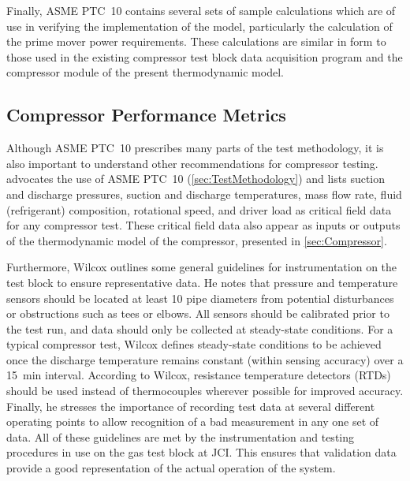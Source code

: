 Finally, ASME PTC~10 contains several sets of sample calculations 
which are of use in verifying the implementation of the model, 
particularly the calculation of the prime mover power requirements.
These calculations are similar in form to those used in the existing
compressor test block data acquisition program and the compressor
module of the present thermodynamic model.

\subsection{Compressor Performance Metrics}
Although ASME PTC~10 prescribes many parts of the test methodology,
it is also important to understand other recommendations for compressor testing. 
\textcite{wilcox2007} advocates the use of ASME PTC~10 (\cref{sec:TestMethodology}) and lists
  suction and discharge pressures,
  suction and discharge temperatures,
  mass flow rate,
  fluid (refrigerant) composition,
  rotational speed, and
  driver load
as critical field data for any compressor test.
These critical field data also appear as inputs or outputs 
of the thermodynamic model of the compressor, presented in \cref{sec:Compressor}.

Furthermore, Wilcox outlines some general guidelines 
for instrumentation on the test block to ensure representative data.  
He notes that pressure and temperature sensors should be located 
at least 10 pipe diameters from potential disturbances or obstructions such as tees or elbows.  
All sensors should be calibrated prior to the test run, 
and data should only be collected at steady-state conditions.  
For a typical compressor test, Wilcox defines steady-state conditions to be achieved 
once the discharge temperature remains constant (within sensing accuracy) over a \SI{15}{\minute} interval. 
According to Wilcox, resistance temperature detectors (RTDs)%
should be used instead of thermocouples wherever possible for improved accuracy. 
Finally, he stresses the importance of recording test data at several different operating points 
to allow recognition of a bad measurement in any one set of data.
All of these guidelines are met by the instrumentation and testing procedures
in use on the  gas test block at JCI.
This ensures that validation data provide a good representation
of the actual operation of the system.

